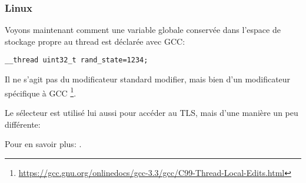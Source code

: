 ﻿\subsubsection{Linux}

Voyons maintenant comment une variable globale conservée dans l'espace de stockage propre au thread 
est déclarée avec GCC:

\begin{lstlisting}
__thread uint32_t rand_state=1234;
\end{lstlisting}

Il ne s'agit pas du modificateur standard \CCpp modifier, mais bien d'un modificateur spécifique à 
GCC
\footnote{\url{https://gcc.gnu.org/onlinedocs/gcc-3.3/gcc/C99-Thread-Local-Edits.html}}.


Le sélecteur  est utilisé lui aussi pour accéder au \ac{TLS}, mais d'une manière un peu 
différente:




Pour en savoir plus: \DrepperTLS.

